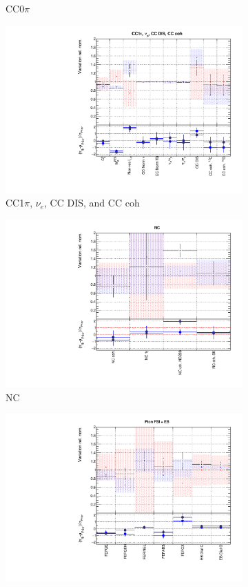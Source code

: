 \begin{figure}[t]
\begin{subfigure}{0.49\textwidth}
  \caption{CC0$\pi$}
\end{subfigure}
\begin{subfigure}{0.49\textwidth}
  \centering
  \includegraphics[width=0.95\linewidth]{figs/rhcmpdatxsec28_2}
  \caption{CC1$\pi$, $\nu_e$, CC DIS, and CC coh}
\end{subfigure}
\begin{subfigure}{0.49\textwidth}
  \centering
  \includegraphics[width=0.95\linewidth]{figs/rhcmpdatxsec28_3}
  \caption{NC}
\end{subfigure}
\begin{subfigure}{0.49\textwidth}
  \centering
  \includegraphics[width=0.95\linewidth]{figs/rhcmpdatxsec28_4}

\end{subfigure}
\end{figure}
